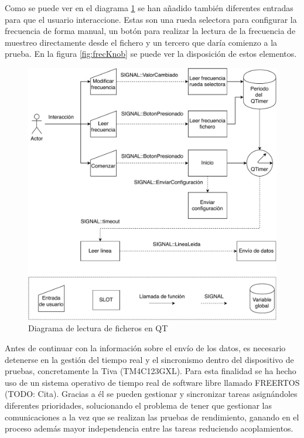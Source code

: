         Como se puede ver en el diagrama \ref{fig:CompleteFileRead} se han añadido también diferentes entradas para que el usuario interaccione. Estas son una rueda selectora para configurar la frecuencia de forma manual, un botón para realizar la lectura de la frecuencia de muestreo directamente desde el fichero y un tercero que daría comienzo a la prueba. En la figura \ref{fig:frecKnob} se puede ver la disposición de estos elementos.

        \begin{figure} [H] 
                \centering
                        \includegraphics[width =\linewidth]{figuras/CompleteFileRead.pdf}
                \caption{Diagrama de lectura de ficheros en QT}
                \label{fig:CompleteFileRead}
        \end{figure}

        Antes de continuar con la información sobre el envío de los datos, es necesario detenerse en la gestión del tiempo real y el sincronismo dentro del dispositivo de pruebas, concretamente la Tiva (TM4C123GXL). Para esta finalidad se ha hecho uso de un sistema operativo de tiempo real de software libre llamado FREERTOS (TODO: Cita). Gracias a él se pueden gestionar y sincronizar tareas asignándoles diferentes prioridades, solucionando el problema de tener que gestionar las comunicaciones a la vez que se realizan las pruebas de rendimiento, ganando en el proceso además mayor independencia entre las tareas reduciendo acoplamientos.
        
